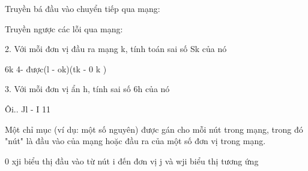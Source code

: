 Truyền bá đầu vào chuyển tiếp qua mạng:

Truyền ngược các lỗi qua mạng:

2. Với mỗi đơn vị đầu ra mạng k, tính toán sai số Sk của nó

6k 4- được(l - ok)(tk - 0 k )

3. Với mỗi đơn vị ẩn h, tính sai số 6h của nó

Ôi.. Jl - I 11

Một chỉ mục (ví dụ: một số nguyên) được gán cho mỗi nút trong mạng, trong đó "nút" là đầu vào của mạng hoặc đầu ra của một số đơn vị trong mạng.

0 xji biểu thị đầu vào từ nút i đến đơn vị j và wji biểu thị tương ứng

